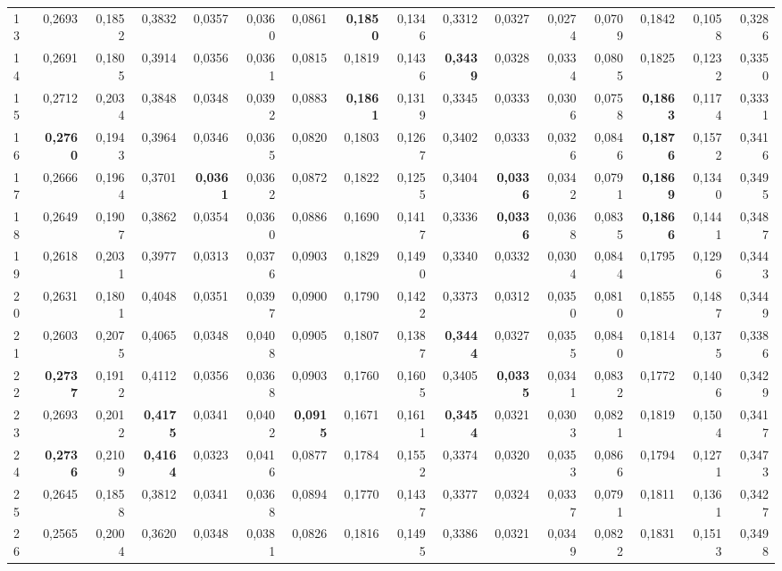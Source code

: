 \begin{table}[htp!]
\begin{adjustwidth}{-2cm}{}
\begin{tabular}{ l | *{15}{| r}}
13	&	0,2693	&	0,1852	&	0,3832	&	0,0357	&	0,0360	&	0,0861	&	\textbf{0,1850}	&	0,1346	&	0,3312	&	0,0327	&	0,0274	&	0,0709	&	0,1842	&	0,1058	&	0,3286	\\
14	&	0,2691	&	0,1805	&	0,3914	&	0,0356	&	0,0361	&	0,0815	&	0,1819	&	0,1436	&	\textbf{0,3439}	&	0,0328	&	0,0334	&	0,0805	&	0,1825	&	0,1232	&	0,3350	\\
15	&	0,2712	&	0,2034	&	0,3848	&	0,0348	&	0,0392	&	0,0883	&	\textbf{0,1861}	&	0,1319	&	0,3345	&	0,0333	&	0,0306	&	0,0758	&	\textbf{0,1863}	&	0,1174	&	0,3331	\\
16	&	\textbf{0,2760}	&	0,1943	&	0,3964	&	0,0346	&	0,0365	&	0,0820	&	0,1803	&	0,1267	&	0,3402	&	0,0333	&	0,0326	&	0,0846	&	\textbf{0,1876}	&	0,1572	&	0,3416	\\
17	&	0,2666	&	0,1964	&	0,3701	&	\textbf{0,0361}	&	0,0362	&	0,0872	&	0,1822	&	0,1255	&	0,3404	&	\textbf{0,0336}	&	0,0342	&	0,0791	&	\textbf{0,1869}	&	0,1340	&	0,3495	\\
18	&	0,2649	&	0,1907	&	0,3862	&	0,0354	&	0,0360	&	0,0886	&	0,1690	&	0,1417	&	0,3336	&	\textbf{0,0336}	&	0,0368	&	0,0835	&	\textbf{0,1866}	&	0,1441	&	0,3487	\\
19	&	0,2618	&	0,2031	&	0,3977	&	0,0313	&	0,0376	&	0,0903	&	0,1829	&	0,1490	&	0,3340	&	0,0332	&	0,0304	&	0,0844	&	0,1795	&	0,1296	&	0,3443	\\
20	&	0,2631	&	0,1801	&	0,4048	&	0,0351	&	0,0397	&	0,0900	&	0,1790	&	0,1422	&	0,3373	&	0,0312	&	0,0350	&	0,0810	&	0,1855	&	0,1487	&	0,3449	\\
21	&	0,2603	&	0,2075	&	0,4065	&	0,0348	&	0,0408	&	0,0905	&	0,1807	&	0,1387	&	\textbf{0,3444}	&	0,0327	&	0,0355	&	0,0840	&	0,1814	&	0,1375	&	0,3386	\\
22	&	\textbf{0,2737}	&	0,1912	&	0,4112	&	0,0356	&	0,0368	&	0,0903	&	0,1760	&	0,1605	&	0,3405	&	\textbf{0,0335}	&	0,0341	&	0,0832	&	0,1772	&	0,1406	&	0,3429	\\
23	&	0,2693	&	0,2012	&	\textbf{0,4175}	&	0,0341	&	0,0402	&	\textbf{0,0915}	&	0,1671	&	0,1611	&	\textbf{0,3454}	&	0,0321	&	0,0303	&	0,0821	&	0,1819	&	0,1504	&	0,3417	\\
24	&	\textbf{0,2736}	&	0,2109	&	\textbf{0,4164}	&	0,0323	&	0,0416	&	0,0877	&	0,1784	&	0,1552	&	0,3374	&	0,0320	&	0,0353	&	0,0866	&	0,1794	&	0,1271	&	0,3473	\\
25	&	0,2645	&	0,1858	&	0,3812	&	0,0341	&	0,0368	&	0,0894	&	0,1770	&	0,1437	&	0,3377	&	0,0324	&	0,0337	&	0,0791	&	0,1811	&	0,1361	&	0,3427	\\
26	&	0,2565	&	0,2004	&	0,3620	&	0,0348	&	0,0381	&	0,0826	&	0,1816	&	0,1495	&	0,3386	&	0,0321	&	0,0349	&	0,0822	&	0,1831	&	0,1513	&	0,3498	\\

\end{tabular}
\end{adjustwidth}
\end{table}

